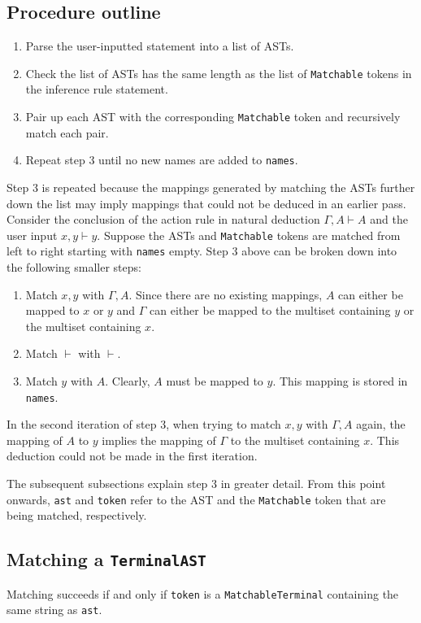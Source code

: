 \subsection{Procedure outline}
\label{matching:procedure}
\begin{enumerate}
    \item Parse the user-inputted statement into a list of ASTs.
    \item Check the list of ASTs has the same length as the list of \lstinline{Matchable} tokens in the inference rule statement.
    \item Pair up each AST with the corresponding \lstinline{Matchable} token and recursively match each pair.
    \item Repeat step 3 until no new names are added to \lstinline{names}.
\end{enumerate}
Step 3 is repeated because the mappings generated by matching the ASTs further down the list may imply mappings that could not be deduced in an earlier pass. Consider the conclusion of the action rule in natural deduction $\Gamma, A \vdash A$ and the user input $x, y \vdash y$. Suppose the ASTs and \lstinline{Matchable} tokens are matched from left to right starting with \lstinline{names} empty. Step 3 above can be broken down into the following smaller steps:
\begin{enumerate}
    \item Match $x, y$ with $\Gamma, A$. Since there are no existing mappings, $A$ can either be mapped to $x$ or $y$ and $\Gamma$ can either be mapped to the multiset containing $y$ or the multiset containing $x$.
    \item Match $\vdash$ with $\vdash$.
    \item Match $y$ with $A$. Clearly, $A$ must be mapped to $y$. This mapping is stored in \lstinline{names}.
\end{enumerate}
In the second iteration of step 3, when trying to match $x, y$ with $\Gamma, A$ again, the mapping of $A$ to $y$ implies the mapping of $\Gamma$ to the multiset containing $x$. This deduction could not be made in the first iteration.

The subsequent subsections explain step 3 in greater detail. From this point onwards, \lstinline{ast} and \lstinline{token} refer to the AST and the \lstinline{Matchable} token that are being matched, respectively.

\subsection{Matching a \texorpdfstring{\lstinline{TerminalAST}}{TerminalAST}}
Matching succeeds if and only if \lstinline{token} is a \lstinline{MatchableTerminal} containing the same string as \lstinline{ast}.

